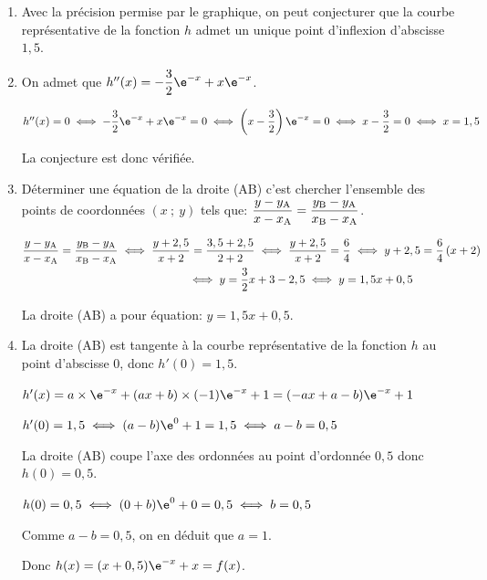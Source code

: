 \begin{enumerate}
\item Avec la précision permise par le graphique, on peut conjecturer que la courbe représentative de la fonction $h$ admet un unique point d'inflexion d'abscisse  $1,5$.

\item On admet que $h''(x) = - \dfrac32 \e^{- x} + x\e^{- x}$.

$h''(x)=0
\iff
-\dfrac{3}{2}\e^{-x}+x\e^{-x}=0
\iff
\left (x-\dfrac{3}{2}\right )\e^{-x}=0
\iff
x-\dfrac{3}{2}=0
\iff
x=1,5$

La conjecture est donc vérifiée.

\item Déterminer une équation de la droite (AB) c'est chercher l'ensemble des points de coordonnées $(x~;~y)$ tels que:
$\dfrac{y-y_{\text A}}{x-x_{\text A}} = \dfrac{y_{\text B}-y_{\text A}}{x_{\text B}-x_{\text A}}$.

$\begin{gathered}\dfrac{y-y_{\text A}}{x-x_{\text A}} = \dfrac{y_{\text B}-y_{\text A}}{x_{\text B}-x_{\text A}}
\iff
\dfrac{y+2,5}{x+2} = \dfrac{3,5 + 2,5}{2 + 2}
\iff
\dfrac{y+2,5}{x+2} = \dfrac{6}{4}
\iff
y+2,5 = \dfrac{6}{4}\left (x+2\right )\\
\phantom{\dfrac{y-y_{\text A}}{x-x_{\text A}} = \dfrac{y_{\text B}-y_{\text A}}{x_{\text B}-x_{\text A}}}
\iff
y=\dfrac{3}{2}x +3-2,5
\iff
y=1,5x + 0,5\end{gathered}$

La droite (AB) a pour équation: $y =1,5x + 0,5$.

\item La droite (AB) est tangente à la courbe représentative de la fonction $h$ au point d'abscisse 0, donc $h'(0)=1,5$.

$h'(x)=a\times \e^{-x} +  (ax+b)\times (-1)\e^{-x}+1
=  (-ax+a-b )\e^{-x}+1$

$h'(0)=1,5
\iff
(a-b)\e^{0}+1=1,5
\iff
a-b=0,5$

La droite (AB) coupe l'axe des ordonnées au point d'ordonnée $0,5$ donc $h(0)=0,5$.

$h(0)=0,5
\iff
(0+b)\e^{0}+0=0,5
\iff
b=0,5$

Comme $a-b=0,5$, on en déduit que $a=1$.

Donc $h(x)=(x+0,5)\e^{-x}+x=f(x)$.
\end{enumerate}

\bigskip
